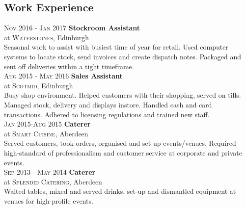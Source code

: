 \documentclass[12pt, a4paper]{article}
\begin{document}
\begin{multicols}{2}
\section{Work Experience}
\small{
\textsc{Nov 2016 - Jan 2017} \textbf{Stockroom Assistant}\\
at \textsc{Waterstones}, Edinburgh\\
Seasonal work to assist with busiest time of year for retail. Used computer systems to locate stock, send invoices and create dispatch notes. Packaged and sent off deliveries within a tight timeframe.\\
\textsc{Aug 2015 - May 2016} \textbf{Sales Assistant}\\
at \textsc{Scotmid}, Edinburgh\\
Busy shop environment. Helped customers with their shopping, served on tills. Managed stock, delivery and displays instore. Handled cash and card transactions. Adhered to licensing regulations and trained new staff.} \\
\textsc{Jan 2015-Aug 2015} \textbf{Caterer}\\
at \textsc{Smart Cuisine}, Aberdeen\\
Served customers, took orders, organised and set-up events/venues. Required high-standard of professionalism and customer service at corporate and private events.\\
\textsc{Sep 2013 - May 2014} \textbf{Caterer}\\
at \textsc{Splendid Catering}, Aberdeen\\
Waited tables, mixed and served drinks, set-up and dismantled equipment at venues for high-profile events.\\
\end{multicols}
\end{document}
